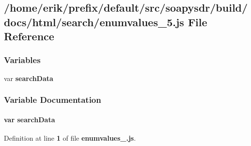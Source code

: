 \subsection{/home/erik/prefix/default/src/soapysdr/build/docs/html/search/enumvalues\+\_\+5.js File Reference}
\label{enumvalues__5_8js}
\subsubsection*{Variables}
\begin{DoxyCompactItemize}
\item 
var {\bf search\+Data}
\end{DoxyCompactItemize}


\subsubsection{Variable Documentation}
\paragraph[{search\+Data}]{\setlength{\rightskip}{0pt plus 5cm}var search\+Data}\label{enumvalues__5_8js_ad01a7523f103d6242ef9b0451861231e}


Definition at line {\bf 1} of file {\bf enumvalues\+\_.\+js}.

